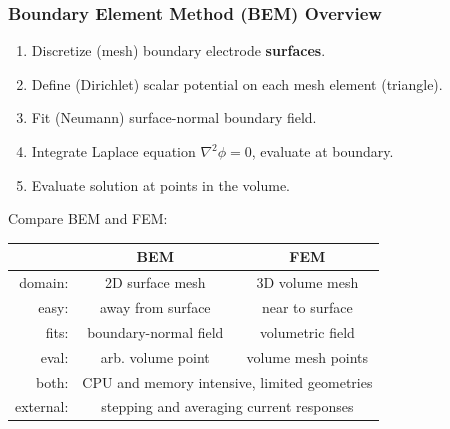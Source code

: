 \documentclass[xcolor=dvipsnames]{beamer}
\begin{document}
\begin{frame}[fragile]
  \frametitle{Boundary Element Method (BEM) Overview}
  \begin{enumerate}  \footnotesize
  \item Discretize (mesh) boundary electrode \textbf{surfaces}.
  \item Define (Dirichlet) scalar potential on each mesh element (triangle).
  \item Fit (Neumann) surface-normal boundary field.
  \item Integrate Laplace equation $\nabla^2\phi=0$, evaluate at boundary.
  \item Evaluate solution at points in the volume.
  \end{enumerate}

  \vfill

  \footnotesize

  Compare BEM and FEM:

  \begin{center}

    \begin{tabular}[h]{rcc}
      & BEM & FEM \\
      \hline
      domain: & 2D surface mesh & 3D volume mesh \\
      easy: & away from surface & near to surface \\
      fits: & boundary-normal field & volumetric field \\
      eval: & arb. volume point & volume mesh points \\
      \hline
      both: & \multicolumn{2}{c}{CPU and memory intensive, limited geometries} \\
      external: & \multicolumn{2}{c}{stepping and averaging current responses} \\
    \end{tabular}
  \end{center}

\end{frame}
\end{document}
